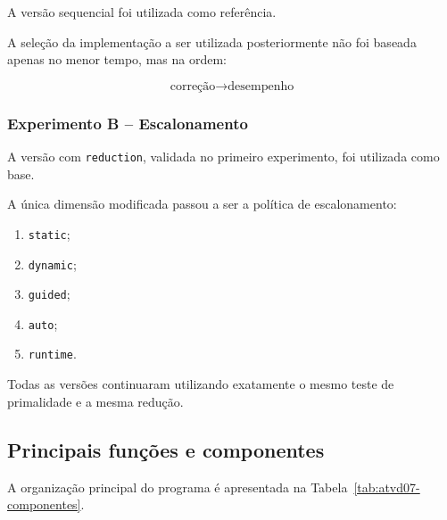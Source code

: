 A versão sequencial foi utilizada como referência.

A seleção da implementação a ser utilizada posteriormente não foi baseada
apenas no menor tempo, mas na ordem:

\[
\boxed{
\text{correção}
\longrightarrow
\text{desempenho}
}
\]


\subsubsection{Experimento B -- Escalonamento}

A versão com \texttt{reduction}, validada no primeiro experimento, foi
utilizada como base.

A única dimensão modificada passou a ser a política de escalonamento:

\begin{enumerate}
    \item \texttt{static};
    \item \texttt{dynamic};
    \item \texttt{guided};
    \item \texttt{auto};
    \item \texttt{runtime}.
\end{enumerate}

Todas as versões continuaram utilizando exatamente o mesmo teste de
primalidade e a mesma redução.


\subsection{Principais funções e componentes}

A organização principal do programa é apresentada na
Tabela~\ref{tab:atvd07-componentes}.


